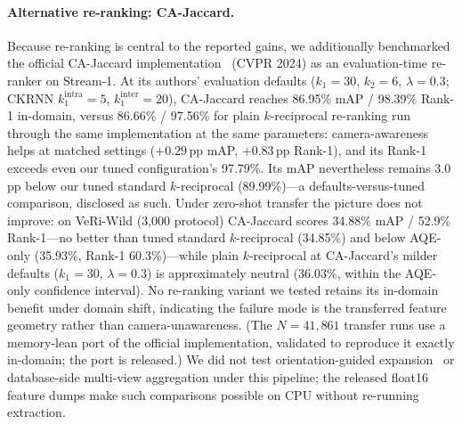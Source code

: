 \documentclass[10pt,a4paper]{article}
\begin{document}
\paragraph{Alternative re-ranking: CA-Jaccard.} Because re-ranking is central
to the reported gains, we additionally benchmarked the official CA-Jaccard
implementation~\cite{chen2024cajaccard} (CVPR 2024) as an evaluation-time
re-ranker on Stream-1. At its authors' evaluation defaults ($k_1{=}30$,
$k_2{=}6$, $\lambda{=}0.3$; CKRNN $k_1^{\mathrm{intra}}{=}5$,
$k_1^{\mathrm{inter}}{=}20$), CA-Jaccard reaches 86.95\% mAP / 98.39\% Rank-1
in-domain, versus 86.66\% / 97.56\% for plain $k$-reciprocal re-ranking run
through the same implementation at the same parameters: camera-awareness helps
at matched settings ($+0.29$\,pp mAP, $+0.83$\,pp Rank-1), and its Rank-1
exceeds even our tuned configuration's 97.79\%. Its mAP nevertheless remains
3.0\,pp below our tuned standard $k$-reciprocal (89.99\%)---a
defaults-versus-tuned comparison, disclosed as such. Under zero-shot transfer
the picture does not improve: on VeRi-Wild (3{,}000 protocol) CA-Jaccard scores
34.88\% mAP / 52.9\% Rank-1---no better than tuned standard $k$-reciprocal
(34.85\%) and below AQE-only (35.93\%, Rank-1 60.3\%)---while plain
$k$-reciprocal at CA-Jaccard's milder defaults ($k_1{=}30$, $\lambda{=}0.3$) is
approximately neutral (36.03\%, within the AQE-only confidence interval). No
re-ranking variant we tested retains its in-domain benefit under domain shift,
indicating the failure mode is the transferred feature geometry rather than
camera-unawareness. (The $N{=}41{,}861$ transfer runs use a memory-lean port of
the official implementation, validated to reproduce it exactly in-domain; the
port is released.) We did not test orientation-guided
expansion~\cite{zhang2022vehiclererank} or database-side multi-view aggregation
under this pipeline; the released float16 feature dumps make such comparisons
possible on CPU without re-running extraction.
\end{document}
